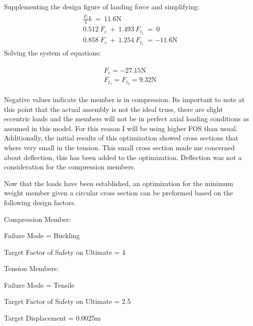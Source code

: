 \documentclass[12pt,letterpaper]{article}
\begin{document}
Supplementing the design figure of landing force and simplifying:
\begin{gather*}
\begin{aligned}
   & \frac{F_l}{4}k~=~11.6\unit{\N}
    \\
    & 0.512~F_c~+~1.493~F_{t_1}~=~0 
    \\
    & 0.858~F_c~+~1.254~F_{t_1}~= -11.6\unit{\N}
\end{aligned}
\end{gather*}
Solving the system of equations:

\begin{gather*}
\begin{aligned}
	& F_c = -27.15\unit{\N}
	\\
    &F_{t_1} = F_{t_2} = 9.32\unit{\N}
\end{aligned}
\end{gather*}

Negative values indicate the member is in compression. Its important to note at this point that the actual assembly is not the ideal truss, there are slight eccentric loads and the members will not be in perfect axial loading conditions as assumed in this model. For this reason I will be using higher FOS than usual. Additionally, the initial results of this optimization showed cross sections that where very small in the tension. This small cross section made me concerned about deflection, this has been added to the optimization. Deflection was not a consideration for the compression members.  

Now that the loads have been established, an optimization for the minimum weight member given a circular cross section can be preformed based on the following design factors.
\\
\begin{description}
	\item Compression Member:
	\begin{description}
		\item Failure Mode = Buckling	
    		\item Target Factor of Safety on Ultimate = 4
	\end{description}
  	\item Tension Members:
  	\begin{description}
  		\item Failure Mode = Tensile
    		\item Target Factor of Safety on Ultimate = 2.5
    		\item Target Displacement = 0.0025\unit{\m}
  	\end{description}
\end{description}
\end{document}
